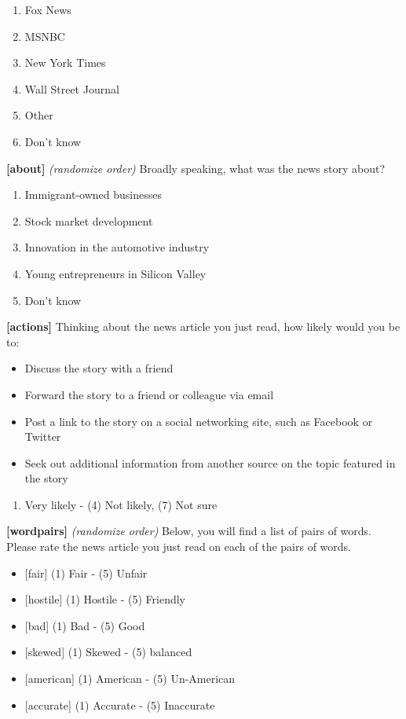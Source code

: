\documentclass[
]{article}
\providecommand{\tightlist}{%
  \setlength{\itemsep}{0pt}\setlength{\parskip}{0pt}}
\begin{document}
\begin{enumerate}
\def\labelenumi{\arabic{enumi}.}
\tightlist
\item
  Fox News
\item
  MSNBC
\item
  New York Times
\item
  Wall Street Journal
\item
  Other
\item
  Don't know
\end{enumerate}

\textbf{{[}about{]}} \emph{(randomize order)} Broadly speaking, what was
the news story about?

\begin{enumerate}
\def\labelenumi{\arabic{enumi}.}
\tightlist
\item
  Immigrant-owned businesses
\item
  Stock market development
\item
  Innovation in the automotive industry
\item
  Young entrepreneurs in Silicon Valley
\item
  Don't know
\end{enumerate}

\textbf{{[}actions{]}} Thinking about the news article you just read,
how likely would you be to:

\begin{itemize}
\tightlist
\item
  Discuss the story with a friend
\item
  Forward the story to a friend or colleague via email
\item
  Post a link to the story on a social networking site, such as Facebook
  or Twitter
\item
  Seek out additional information from another source on the topic
  featured in the story
\end{itemize}

\begin{enumerate}
\def\labelenumi{(\arabic{enumi})}
\tightlist
\item
  Very likely - (4) Not likely, (7) Not sure
\end{enumerate}

\textbf{{[}wordpairs{]}} \emph{(randomize order)} Below, you will find a
list of pairs of words. Please rate the news article you just read on
each of the pairs of words.

\begin{itemize}
\tightlist
\item
  {[}fair{]} (1) Fair - (5) Unfair
\item
  {[}hostile{]} (1) Hostile - (5) Friendly
\item
  {[}bad{]} (1) Bad - (5) Good
\item
  {[}skewed{]} (1) Skewed - (5) balanced
\item
  {[}american{]} (1) American - (5) Un-American
\item
  {[}accurate{]} (1) Accurate - (5) Inaccurate
\end{itemize}
\end{document}
